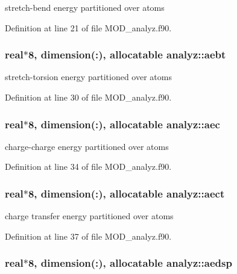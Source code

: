 stretch-\/bend energy partitioned over atoms 



Definition at line 21 of file M\-O\-D\-\_\-analyz.\-f90.

\hypertarget{classanalyz_a6c9179d6da04ccbf1fa2ee6e7b52bfed}{
\subsubsection[{aebt}]{\setlength{\rightskip}{0pt plus 5cm}real$\ast$8, dimension(\-:), allocatable analyz\-::aebt}}\label{classanalyz_a6c9179d6da04ccbf1fa2ee6e7b52bfed}


stretch-\/torsion energy partitioned over atoms 



Definition at line 30 of file M\-O\-D\-\_\-analyz.\-f90.

\hypertarget{classanalyz_a417c64c5509dfd34fd15ed7d2ff8f54e}{
\subsubsection[{aec}]{\setlength{\rightskip}{0pt plus 5cm}real$\ast$8, dimension(\-:), allocatable analyz\-::aec}}\label{classanalyz_a417c64c5509dfd34fd15ed7d2ff8f54e}


charge-\/charge energy partitioned over atoms 



Definition at line 34 of file M\-O\-D\-\_\-analyz.\-f90.

\hypertarget{classanalyz_a2817e27fe9ea427b60b23bb178b85778}{
\subsubsection[{aect}]{\setlength{\rightskip}{0pt plus 5cm}real$\ast$8, dimension(\-:), allocatable analyz\-::aect}}\label{classanalyz_a2817e27fe9ea427b60b23bb178b85778}


charge transfer energy partitioned over atoms 



Definition at line 37 of file M\-O\-D\-\_\-analyz.\-f90.

\hypertarget{classanalyz_a7964f5c1bb8b234c6a3520dbfff952b5}{
\subsubsection[{aedsp}]{\setlength{\rightskip}{0pt plus 5cm}real$\ast$8, dimension(\-:), allocatable analyz\-::aedsp}}\label{classanalyz_a7964f5c1bb8b234c6a3520dbfff952b5}


